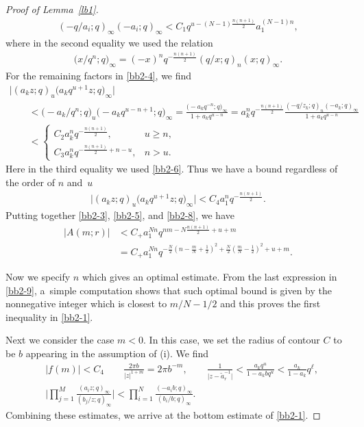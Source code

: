 \documentclass[pdftex]{sigma}
\numberwithin{equation}{section}
\def\i{\infty}
\begin{document}
\begin{proof}[Proof of Lemma~\ref{lb1}]
\begin{gather}
 (-q/a_i;q)_\infty (-a_i;q)_\i
 <C_1 q^{u-(N-1)\frac{n(n+1)}{2}} a_{1}^{(N-1)n},\label{bb2-5}
\end{gather}
 where
 in the second equality we used the relation
 \begin{align}
 \label{bb2-6}
 \big(x/q^n;q\big)_\i=(-x)^n q^{-\frac{n(n+1)}{2}}
 (q/x;q)_{n}(x;q)_{\i}.
 \end{align}
 For the remaining factors in \eqref{bb2-4}, we find
 \begin{gather*}%
 \big|(a_k z;q)_u \big(a_k q^{u+1}z;q\big)_{\i}\big| \\
 \qquad <\bigl(-a_k /q^n;q\bigr)_u\bigl(-a_k q^{u-n+1};q\bigr)_{\i}=\frac{\bigl(-a_k q^{-n};q\bigr)_\infty}{1+a_k q^{u-n}} =
 a_k^n q^{-\frac{n(n+1)}{2}}\!\frac{(-q/z_k;q)_n(-a_k;q)_{\infty}}{1+a_kq^{u-n}}\\
 \qquad <
 \begin{cases}
 C_2 a_k^n q^{-\frac{n(n+1)}{2}}, & u\ge n,
 \\
 C_3 a_k^n q^{-\frac{n(n+1)}{2}+n-u}, & n>u.
 \end{cases}
 \end{gather*}
 Here in the third equality we used \eqref{bb2-6}.
 Thus we have a bound regardless of the order of $n$ and~$u$
 \begin{align}
 \label{bb2-8}
 \big|(a_k z;q)_u\big(a_kq^{u+1}z;q\big)_{\i}\big|
 <
 C_4 a_{1}^nq^{-\frac{n(n+1)}{2}}.
 \end{align}
 Putting together \eqref{bb2-3}, \eqref{bb2-5}, and \eqref{bb2-8}, we have
 \begin{align}
 \label{bb2-9}
 |A(m;r)|&<C_+ a_{1}^{Nn} q^{nm-N\frac{n(n+1)}{2}+u+m}
 \nonumber\\
 &=C_+ a_{1}^{Nn}q^{-\frac{N}{2}\left(n-\frac{m}{N}+\frac12\right)^2+\frac{N}{2}\left(\frac{m}{N}-\frac12\right)^2+u+m}.
 \end{align}

 Now we specify $n$ which gives an optimal estimate.
 From the last expression in \eqref{bb2-9}, a~simple computation shows that such optimal bound is given by the nonnegative integer which is closest to $m/N-1/2$ and this proves the first inequality in \eqref{bb2-1}.


 Next we consider the case $m<0$. In this case, we set the radius of contour $C$ to be $b$ appearing in the assumption of (i). We find{\samepage
 \begin{align*}
 &|f(m)|<C_4
 \qquad
 \frac{2\pi b}{|z|^{1+m}}=2\pi b^{-m},
 \qquad
 \frac{1}{\big|z-\tilde{a}^{-1}_r\big|}
 <\frac{a_k q^{u}}{1-a_k bq^{u}}
 <\frac{a_k}{1-a_k} q^{\ell},
 \nonumber\\
 &\Bigg|\prod_{j=1}^M\frac{(a_iz;q)_{\i}}{(b_j/z;q)_{\i}}\Bigg|
 <\prod_{i=1}^N\frac{(-a_ib;q)_\i}{(b_i/b;q)_{\i}}.
 \end{align*}
 Combining these estimates, we arrive at the bottom estimate of \eqref{bb2-1}.}



\end{proof}
\end{document}
